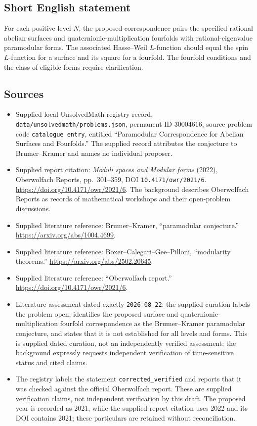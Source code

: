 \documentclass[11pt]{article}
\begin{document}
\subsection{Short English statement}
For each positive level \(N\), the proposed correspondence pairs the specified rational abelian surfaces and quaternionic-multiplication fourfolds with rational-eigenvalue paramodular forms. The associated Hasse--Weil \(L\)-function should equal the spin \(L\)-function for a surface and its square for a fourfold. The fourfold conditions and the class of eligible forms require clarification.
\subsection{Sources}
\begin{itemize}
\item Supplied local UnsolvedMath registry record, \texttt{data/unsolvedmath/problems.json}, permanent ID \(30004616\), source problem code \texttt{catalogue entry}, entitled ``Paramodular Correspondence for Abelian Surfaces and Fourfolds.'' The supplied record attributes the conjecture to Brumer--Kramer and names no individual proposer.
\item Supplied report citation: \emph{Moduli spaces and Modular forms} (2022), Oberwolfach Reports, pp.~301--359, DOI \texttt{10.4171/owr/2021/6}. \url{https://doi.org/10.4171/owr/2021/6}. The background describes Oberwolfach Reports as records of mathematical workshops and their open-problem discussions.
\item Supplied literature reference: Brumer--Kramer, ``paramodular conjecture.'' \url{https://arxiv.org/abs/1004.4699}.
\item Supplied literature reference: Boxer--Calegari--Gee--Pilloni, ``modularity theorems.'' \url{https://arxiv.org/abs/2502.20645}.
\item Supplied literature reference: ``Oberwolfach report.'' \url{https://doi.org/10.4171/owr/2021/6}.
\item Literature assessment dated exactly \texttt{2026-08-22}: the supplied curation labels the problem open, identifies the proposed surface and quaternionic-multiplication fourfold correspondence as the Brumer--Kramer paramodular conjecture, and states that it is not established for all levels and forms. This is supplied dated curation, not an independently verified assessment; the background expressly requests independent verification of time-sensitive status and cited claims.
\item The registry labels the statement \texttt{corrected\_verified} and reports that it was checked against the official Oberwolfach report. These are supplied verification claims, not independent verification by this draft. The proposed year is recorded as 2021, while the supplied report citation uses 2022 and its DOI contains 2021; these particulars are retained without reconciliation.
\end{itemize}
\end{document}
